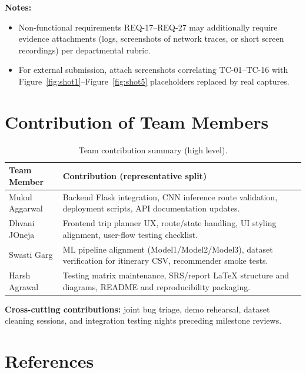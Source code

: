 \documentclass[12pt,oneside,openany]{report}
\begin{document}
\noindent\textbf{Notes:}
\begin{itemize}[nosep]
\item Non-functional requirements REQ-17--REQ-27 may additionally require evidence attachments (logs, screenshots of network traces, or short screen recordings) per departmental rubric.
\item For external submission, attach screenshots correlating TC-01--TC-16 with Figure~\ref{fig:shot1}--Figure~\ref{fig:shot5} placeholders replaced by real captures.
\end{itemize}

\chapter{Contribution of Team Members}

\begin{table}[H]
\centering
\begin{tabularx}{0.95\textwidth}{|l|X|}
\hline
\textbf{Team Member} & \textbf{Contribution (representative split)} \\
\hline
Mukul Aggarwal &
Backend Flask integration, CNN inference route validation, deployment scripts, API documentation updates. \\
\hline
Dhvani JOneja &
Frontend trip planner UX, route/state handling, UI styling alignment, user-flow testing checklist. \\
\hline
Swasti Garg &
ML pipeline alignment (Model1/Model2/Model3), dataset verification for itinerary CSV, recommender smoke tests. \\
\hline
Harsh Agrawal &
Testing matrix maintenance, SRS/report LaTeX structure and diagrams, README and reproducibility packaging. \\
\hline
\end{tabularx}
\caption{Team contribution summary (high level).}
\end{table}

\noindent\textbf{Cross-cutting contributions:} joint bug triage, demo rehearsal, dataset cleaning sessions, and integration testing nights preceding milestone reviews.

\chapter{References}
\end{document}
